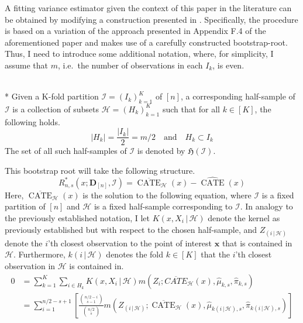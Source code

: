 A fitting variance estimator given the context of this paper in the literature can be obtained by modifying a construction presented in \citet{ritzwoller_simultaneous_2024}.
Specifically, the procedure is based on a variation of the approach presented in Appendix F.4 of the aforementioned paper and makes use of a carefully constructed bootstrap-root.
Thus, I need to introduce some additional notation, where, for simplicity, I assume that $m$, i.e.\ the number of observations in each $I_k$, is even.
\begin{boxD}
	\begin{dfn}\label{def:CF_HSample}\mbox{}\\*
		Given a K-fold partition $\mathcal{I} = \left(I_k\right)_{k = 1}^{K}$ of $[n]$, a corresponding half-sample of $\mathcal{I}$ is a collection of subsets $\mathcal{H} = \left(H_{k}\right)_{k = 1}^{K}$ such that for all $k \in [K]$, the following holds.
		\begin{equation}
			|H_k| = \frac{|I_k|}{2}= m/2
			\quad \text{and} \quad
			H_k \subset I_k
		\end{equation}
		The set of all such half-samples of $\mathcal{I}$ is denoted by $\mathfrak{H}\left(\mathcal{I}\right)$.
	\end{dfn}
\end{boxD}
This bootstrap root will take the following structure.
\begin{equation}
	R^{*}_{n,s}\left(x; \mathbf{D}_{[n]}, \mathcal{I}\right)
	= \overline{\operatorname{CATE}}_{\mathcal{H}}\left(x\right)
	- \widehat{\operatorname{CATE}}\left(x\right)
\end{equation}
Here, $\overline{\operatorname{CATE}}_{\mathcal{H}}\left(x\right)$ is the solution to the following equation, where $\mathcal{I}$ is a fixed partition of $[n]$ and $\mathcal{H}$ is a fixed half-sample corresponding to $\mathcal{I}$.
In analogy to the previously established notation, I let $K(x, X_{i} \, | \, \mathcal{H})$ denote the kernel as previously established but with respect to the chosen half-sample, and $Z_{(i \, | \, \mathcal{H})}$ denote the $i$'th closest observation to the point of interest $\mathbf{x}$ that is contained in $\mathcal{H}$.
Furthermore, $k(i \, | \, \mathcal{H})$ denotes the fold $k \in [K]$ that the $i$'th closest observation in $\mathcal{H}$ is contained in.
\begin{equation}
	\begin{aligned}
		0 & = \sum_{k = 1}^{K} \sum_{i \in H_k} K(x, X_{i} \, | \, \mathcal{H}) m\left(Z_{i}; \overline{CATE}_{\mathcal{H}}\left(x\right), \hat{\mu}_{k,s}, \hat{\pi}_{k,s}\right)\\
	 	& = \sum_{i = 1}^{n/2 - s + 1} \left[\frac{\binom{n/2-i}{s-1}}{\binom{n/2}{s}} m\left(Z_{(i \, | \, \mathcal{H})}; \overline{\operatorname{CATE}}_{\mathcal{H}}\left(x\right), \hat{\mu}_{k(i \, | \, \mathcal{H}),s}, \hat{\pi}_{k(i\, | \, \mathcal{H}),s}\right)\right]
	\end{aligned}
\end{equation}
